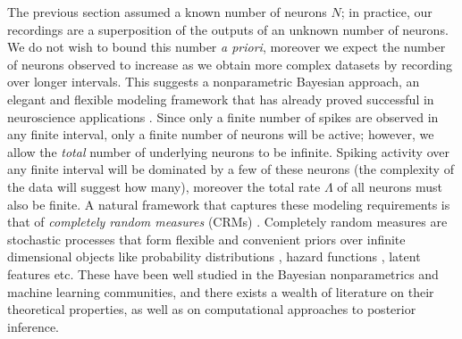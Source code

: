 The previous section assumed a known number of neurons $N$; in practice, our recordings are a superposition of the outputs of an unknown
number of neurons. We do not wish to bound this number \emph{a priori}, moreover we expect the number of neurons observed to increase as we obtain
more complex datasets by recording over longer intervals. This suggests a nonparametric Bayesian approach, an elegant and flexible modeling framework that has  already proved 
successful in neuroscience applications \citep{WoodBla2008}.
Since only a finite number of spikes are observed in any finite interval, only a finite number of neurons will be active; however, we allow the \emph{total} 
number of underlying neurons to be infinite. Spiking activity over any finite interval will be dominated by a few of these neurons (the complexity of the
data will suggest how many), moreover the total rate $\Lambda$ of all
neurons must also be finite.
A natural framework that captures these  modeling requirements is that of \emph{completely random measures} (CRMs) \citep{Kingman:PJM67}.
Completely random measures are stochastic processes that form flexible and convenient priors over
infinite dimensional objects like probability distributions \citep{JamesLP09}, hazard functions \citep{Hjo1990}, latent features \citep{ThiJor2007} etc. 
These have been well studied in the Bayesian nonparametrics and machine learning communities, and there exists a wealth of literature on
their theoretical properties, as well as on computational approaches to posterior inference.

